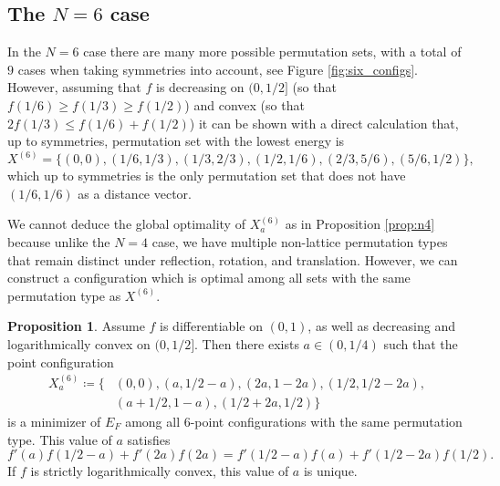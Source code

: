 \documentclass[a4paper,12pt]{article}
\numberwithin{equation}{section}
\theoremstyle{definition}
\newtheorem{prop}[thm]{Proposition}
\begin{document}
\subsection{The $N=6$ case}

In the $N=6$ case there are many more possible permutation sets, with a total of $9$ cases when taking symmetries into account, see Figure \ref{fig:six_configs}. However, assuming that $f$ is decreasing on $(0,1/2]$ (so that $f(1/6)\ge f(1/3)\ge f(1/2)$) and convex (so that $2f(1/3)\le f(1/6)+f(1/2)$) it can be shown with a direct calculation that, up to symmetries, permutation set with the lowest energy  is $$X^{(6)}=\{(0,0),(1/6,1/3),(1/3,2/3),(1/2,1/6),(2/3,5/6),(5/6,1/2)\},$$ which up to symmetries is the only permutation set that does not have $(1/6,1/6)$ as a distance vector.



We cannot deduce the global optimality of $X_a^{(6)}$ as in Proposition \ref{prop:n4} because unlike the $N=4$ case, we have multiple non-lattice permutation types that remain distinct under reflection, rotation, and translation. However, we can construct  a  configuration which is optimal among all sets with  the same permutation type as $X^{(6)}$.

\begin{prop}\label{prop:n6}
    Assume  $f$ is differentiable on $(0,1)$, as well as   decreasing and logarithmically convex on $(0,1/2]$. Then there exists  $a\in(0,1/4)$ such that the point configuration 
    \begin{align*}X_a^{(6)}\coloneqq\{&(0,0),(a,1/2-a),(2a,1-2a),(1/2,1/2-2a),\\&(a+1/2,1-a),(1/2+2a,1/2)\}\end{align*}  is a  minimizer of $E_F$  among all $6$-point configurations with the same permutation type. This value of $a$ satisfies    \begin{equation}\label{eq:n6_condition}
    f'(a)f(1/2-a)+f'(2a)f(2a)=f'(1/2-a)f(a)+f'(1/2-2a)f(1/2).    
    \end{equation}
    If $f$ is strictly logarithmically convex, this value of $a$ is unique.
    
\end{prop}
\end{document}
